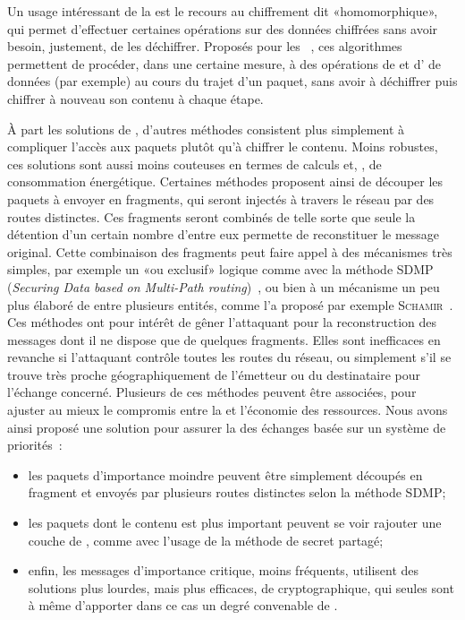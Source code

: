 Un usage intéressant de la  est le recours au chiffrement dit «homomorphique», qui permet d'effectuer certaines opérations sur des données chiffrées sans avoir besoin, justement, de les déchiffrer.
Proposés pour les \rcs~\cite{BBTY14}, ces algorithmes permettent de procéder, dans une certaine mesure, à des opérations de  et d' de données (par exemple) au cours du trajet d'un paquet, sans avoir à déchiffrer puis chiffrer à nouveau son contenu à chaque étape.

À part les solutions de , d'autres méthodes consistent plus simplement à compliquer l'accès aux paquets plutôt qu'à chiffrer le contenu.
Moins robustes, ces solutions sont aussi moins couteuses en termes de calculs et, \infine, de consommation énergétique.
Certaines méthodes proposent ainsi de découper les paquets à envoyer en fragments, qui seront injectés à travers le réseau par des routes distinctes.
Ces fragments seront combinés de telle sorte que seule la détention d'un certain nombre d'entre eux permette de reconstituer le message original.
Cette combinaison des fragments peut faire appel à des mécanismes très simples, par exemple un «ou exclusif» logique comme avec la méthode SDMP (\textit{Securing Data based on Multi-Path routing})~\cite{BM10}, ou bien à un mécanisme un peu plus élaboré de  entre plusieurs entités, comme l'a proposé par exemple \textsc{Schamir}~\cite{Sha79}.
Ces méthodes ont pour intérêt de gêner l'attaquant pour la reconstruction des messages dont il ne dispose que de quelques fragments.
Elles sont inefficaces en revanche si l'attaquant contrôle toutes les routes du réseau, ou simplement s'il se trouve très proche géographiquement de l'émetteur ou du destinataire pour l'échange concerné.
Plusieurs de ces méthodes peuvent être associées, pour ajuster au mieux le compromis entre la \secu et l'économie des ressources.
Nous avons ainsi proposé une solution pour assurer la  des échanges basée sur un système de priorités~\cite{MMB13}:
\begin{itemize}
    \item les paquets d'importance moindre peuvent être simplement découpés en fragment et envoyés par plusieurs routes distinctes selon la méthode SDMP;
    \item les paquets dont le contenu est plus important peuvent se voir rajouter une couche de \secu, comme avec l'usage de la méthode de secret partagé;
    \item enfin, les messages d'importance critique, moins fréquents, utilisent des solutions plus lourdes, mais plus efficaces, de  cryptographique, qui seules sont à même d'apporter dans ce cas un degré convenable de \secu.
\end{itemize}

